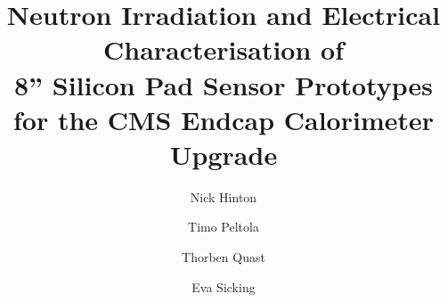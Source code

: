 \documentclass[a4paper,11pt]{article}
\title{\boldmath Neutron Irradiation and Electrical Characterisation of \\8'' Silicon Pad Sensor Prototypes for the CMS Endcap Calorimeter Upgrade}
\author[a]{Nick Hinton}
\author[b]{Timo Peltola}
\author[c]{Thorben Quast}
\author[c]{Eva Sicking}
\affiliation[a]{Brown University}
\affiliation[b]{Texas Tech University}
\affiliation[c]{CERN Experimental Physics Department}
\begin{document}
\maketitle
\flushbottom

\linenumbers








\appendix





\end{document}
